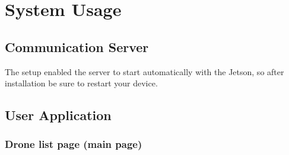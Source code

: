 \setcounter{tocdepth}{3}
\setcounter{secnumdepth}{3}

\chapter{System Usage} \cite{darknet}

\section{Communication Server}

The setup enabled the server to start automatically with the Jetson, so after installation be sure to restart your device.

\section{ User Application }
\subsection{Drone list page (main page)}

